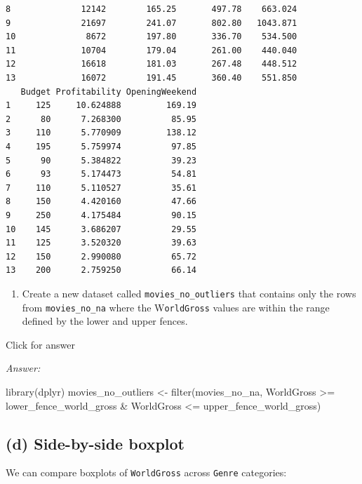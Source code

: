 \documentclass[
]{book}
\newenvironment{Shaded}{\begin{snugshade}}{\end{snugshade}}
\newcommand{\FunctionTok}[1]{\textcolor[rgb]{0.00,0.00,0.00}{#1}}
\newcommand{\NormalTok}[1]{#1}
\newcommand{\OtherTok}[1]{\textcolor[rgb]{0.56,0.35,0.01}{#1}}
\newcommand{\SpecialCharTok}[1]{\textcolor[rgb]{0.00,0.00,0.00}{#1}}
\providecommand{\tightlist}{%
  \setlength{\itemsep}{0pt}\setlength{\parskip}{0pt}}
\begin{document}
\begin{verbatim}
8              12142        165.25       497.78    663.024
9              21697        241.07       802.80   1043.871
10              8672        197.80       336.70    534.500
11             10704        179.04       261.00    440.040
12             16618        181.03       267.48    448.512
13             16072        191.45       360.40    551.850
   Budget Profitability OpeningWeekend
1     125     10.624888         169.19
2      80      7.268300          85.95
3     110      5.770909         138.12
4     195      5.759974          97.85
5      90      5.384822          39.23
6      93      5.174473          54.81
7     110      5.110527          35.61
8     150      4.420160          47.66
9     250      4.175484          90.15
10    145      3.686207          29.55
11    125      3.520320          39.63
12    150      2.990080          65.72
13    200      2.759250          66.14
\end{verbatim}

\begin{enumerate}
\def\labelenumi{(\alph{enumi})}
\setcounter{enumi}{2}
\tightlist
\item
  Create a new dataset called \texttt{movies\_no\_outliers} that contains only the rows from \texttt{movies\_no\_na} where the W\texttt{orldGross} values are within the range defined by the lower and upper fences.
\end{enumerate}

Click for answer

\emph{Answer:}

\begin{Shaded}
\begin{Highlighting}[]
\FunctionTok{library}\NormalTok{(dplyr)}
\NormalTok{movies\_no\_outliers }\OtherTok{\textless{}{-}} \FunctionTok{filter}\NormalTok{(movies\_no\_na, WorldGross }\SpecialCharTok{\textgreater{}=}\NormalTok{ lower\_fence\_world\_gross }\SpecialCharTok{\&}\NormalTok{ WorldGross }\SpecialCharTok{\textless{}=}\NormalTok{ upper\_fence\_world\_gross)}
\end{Highlighting}
\end{Shaded}

\hypertarget{d-side-by-side-boxplot}{%
\subsection{(d) Side-by-side boxplot}\label{d-side-by-side-boxplot}}

We can compare boxplots of \texttt{WorldGross} across \texttt{Genre} categories:
\end{document}
